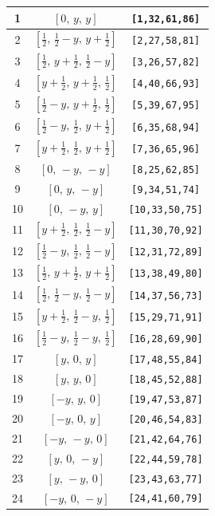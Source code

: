 \documentclass[fleqn,8pt]{jsarticle}
\begin{document}
\begin{longtable}{ccc}
1 & $\left[ 0,\, y,\, y \right]$ & {\tt [1,32,61,86]} \\ \hline
2 & $\left[ \frac{1}{2},\, \frac{1}{2} - y,\, y + \frac{1}{2} \right]$ & {\tt [2,27,58,81]} \\ \hline
3 & $\left[ \frac{1}{2},\, y + \frac{1}{2},\, \frac{1}{2} - y \right]$ & {\tt [3,26,57,82]} \\ \hline
4 & $\left[ y + \frac{1}{2},\, y + \frac{1}{2},\, \frac{1}{2} \right]$ & {\tt [4,40,66,93]} \\ \hline
5 & $\left[ \frac{1}{2} - y,\, y + \frac{1}{2},\, \frac{1}{2} \right]$ & {\tt [5,39,67,95]} \\ \hline
6 & $\left[ \frac{1}{2} - y,\, \frac{1}{2},\, y + \frac{1}{2} \right]$ & {\tt [6,35,68,94]} \\ \hline
7 & $\left[ y + \frac{1}{2},\, \frac{1}{2},\, y + \frac{1}{2} \right]$ & {\tt [7,36,65,96]} \\ \hline
8 & $\left[ 0,\, - y,\, - y \right]$ & {\tt [8,25,62,85]} \\ \hline
9 & $\left[ 0,\, y,\, - y \right]$ & {\tt [9,34,51,74]} \\ \hline
10 & $\left[ 0,\, - y,\, y \right]$ & {\tt [10,33,50,75]} \\ \hline
11 & $\left[ y + \frac{1}{2},\, \frac{1}{2},\, \frac{1}{2} - y \right]$ & {\tt [11,30,70,92]} \\ \hline
12 & $\left[ \frac{1}{2} - y,\, \frac{1}{2},\, \frac{1}{2} - y \right]$ & {\tt [12,31,72,89]} \\ \hline
13 & $\left[ \frac{1}{2},\, y + \frac{1}{2},\, y + \frac{1}{2} \right]$ & {\tt [13,38,49,80]} \\ \hline
14 & $\left[ \frac{1}{2},\, \frac{1}{2} - y,\, \frac{1}{2} - y \right]$ & {\tt [14,37,56,73]} \\ \hline
15 & $\left[ y + \frac{1}{2},\, \frac{1}{2} - y,\, \frac{1}{2} \right]$ & {\tt [15,29,71,91]} \\ \hline
16 & $\left[ \frac{1}{2} - y,\, \frac{1}{2} - y,\, \frac{1}{2} \right]$ & {\tt [16,28,69,90]} \\ \hline
17 & $\left[ y,\, 0,\, y \right]$ & {\tt [17,48,55,84]} \\ \hline
18 & $\left[ y,\, y,\, 0 \right]$ & {\tt [18,45,52,88]} \\ \hline
19 & $\left[ - y,\, y,\, 0 \right]$ & {\tt [19,47,53,87]} \\ \hline
20 & $\left[ - y,\, 0,\, y \right]$ & {\tt [20,46,54,83]} \\ \hline
21 & $\left[ - y,\, - y,\, 0 \right]$ & {\tt [21,42,64,76]} \\ \hline
22 & $\left[ y,\, 0,\, - y \right]$ & {\tt [22,44,59,78]} \\ \hline
23 & $\left[ y,\, - y,\, 0 \right]$ & {\tt [23,43,63,77]} \\ \hline
24 & $\left[ - y,\, 0,\, - y \right]$ & {\tt [24,41,60,79]} \\
\end{longtable}
\end{document}
